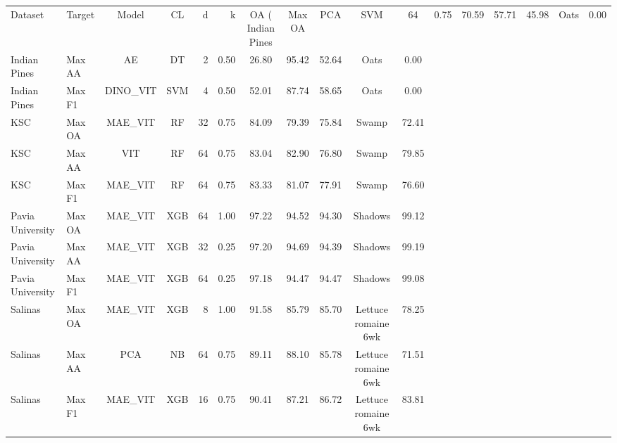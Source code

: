 \begin{tabular}{llccrrccccc}
\toprule
Dataset & Target & Model & CL & d & k & OA (%
\midrule
Indian Pines & Max OA & PCA & SVM & 64 & 0.75 & 70.59 & 57.71 & 45.98 & Oats & 0.00 \\
Indian Pines & Max AA & AE & DT & 2 & 0.50 & 26.80 & 95.42 & 52.64 & Oats & 0.00 \\
Indian Pines & Max F1 & DINO\_VIT & SVM & 4 & 0.50 & 52.01 & 87.74 & 58.65 & Oats & 0.00 \\
KSC & Max OA & MAE\_VIT & RF & 32 & 0.75 & 84.09 & 79.39 & 75.84 & Swamp & 72.41 \\
KSC & Max AA & VIT & RF & 64 & 0.75 & 83.04 & 82.90 & 76.80 & Swamp & 79.85 \\
KSC & Max F1 & MAE\_VIT & RF & 64 & 0.75 & 83.33 & 81.07 & 77.91 & Swamp & 76.60 \\
Pavia University & Max OA & MAE\_VIT & XGB & 64 & 1.00 & 97.22 & 94.52 & 94.30 & Shadows & 99.12 \\
Pavia University & Max AA & MAE\_VIT & XGB & 32 & 0.25 & 97.20 & 94.69 & 94.39 & Shadows & 99.19 \\
Pavia University & Max F1 & MAE\_VIT & XGB & 64 & 0.25 & 97.18 & 94.47 & 94.47 & Shadows & 99.08 \\
Salinas & Max OA & MAE\_VIT & XGB & 8 & 1.00 & 91.58 & 85.79 & 85.70 & Lettuce romaine 6wk & 78.25 \\
Salinas & Max AA & PCA & NB & 64 & 0.75 & 89.11 & 88.10 & 85.78 & Lettuce romaine 6wk & 71.51 \\
Salinas & Max F1 & MAE\_VIT & XGB & 16 & 0.75 & 90.41 & 87.21 & 86.72 & Lettuce romaine 6wk & 83.81 \\
\bottomrule
\end{tabular}

